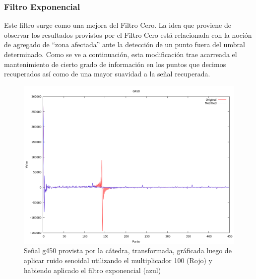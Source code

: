 \subsubsection{Filtro Exponencial}

Este filtro surge como una mejora del Filtro Cero. La idea que proviene de
observar los resultados provistos por el Filtro Cero est\'a relacionada con la
noci\'on de agregado de ``zona afectada'' ante la detecci\'on de un punto fuera
del umbral determinado. Como se ve a continuaci\'on, esta modificaci\'on trae
acarreada el mantenimiento de cierto grado de informaci\'on en los puntos que
decimos recuperados as\'i como de una mayor suavidad a la se\~nal recuperada.


\begin{figure}
\begin {center}
\includegraphics[width=360pt]{imagenes/g450-sin100-exp-spec.png}
\end {center}
\caption{Se\~nal g450 provista por la c\'atedra, transformada, gr\'aficada
luego de aplicar ruido senoidal utilizando el multiplicador 100 (Rojo) y 
habiendo aplicado el filtro exponencial (azul)}
\label{fig:SinProm}
\end{figure}


